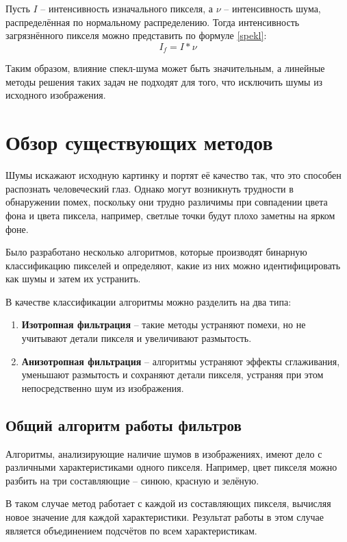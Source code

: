 Пусть $I$ -- интенсивность изначального пикселя, а $\nu$ -- интенсивность шума, распределённая по нормальному распределению. 
Тогда интенсивность загрязнённого пикселя можно представить по формуле \ref{spekl}: 
\begin{equation}
	\label{spekl}
	I_f = I * \nu
\end{equation}

Таким образом, влияние спекл-шума может быть значительным, а линейные методы решения таких задач не подходят для того, что исключить шумы из исходного изображения.

\section{Обзор существующих методов}
Шумы искажают исходную картинку и портят её качество так, что это способен распознать человеческий глаз.
Однако могут возникнуть трудности в обнаружении помех, поскольку они трудно различимы при совпадении цвета фона и цвета пиксела, например, светлые точки будут плохо заметны на ярком фоне.

Было разработано несколько алгоритмов, которые производят бинарную классификацию пикселей и определяют, какие из них можно идентифицировать как шумы и затем их устранить.

В качестве классификации алгоритмы можно разделить на два типа:
\begin{enumerate}
	\item \textbf{Изотропная фильтрация} -- такие методы устраняют помехи, но не учитывают детали пикселя и увеличивают размытость.
	\item \textbf{Анизотропная фильтрация} -- алгоритмы устраняют эффекты сглаживания, уменьшают размытость и сохраняют детали пикселя, устраняя при этом непосредственно шум из изображения.
\end{enumerate}


\subsection{Общий алгоритм работы фильтров}
Алгоритмы, анализирующие наличие шумов в изображениях, имеют дело с различными характеристиками одного пикселя.
Например, цвет пикселя можно разбить на три составляющие -- синюю, красную и зелёную. 

В таком случае метод работает с каждой из составляющих пикселя, вычисляя новое значение для каждой характеристики.
Результат работы в этом случае является объединением подсчётов по всем характеристикам.

